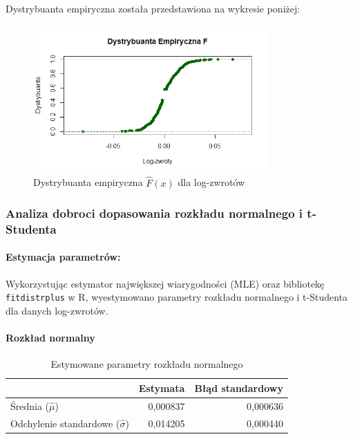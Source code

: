 \documentclass[a4paper,11pt]{article}
\begin{document}
Dystrybuanta empiryczna została przedstawiona na wykresie poniżej:

\begin{figure}[H]
    \centering
    \includegraphics[width=0.8\textwidth]{./Wojtek/dystrybuanta-empiryczna.png}
    \caption{Dystrybuanta empiryczna $\hat{F}(x)$ dla log-zwrotów}
    \label{fig:dystrybuanta_empiryczna}
\end{figure}

\subsubsection{Analiza dobroci dopasowania rozkładu normalnego i t-Studenta}

\paragraph{Estymacja parametrów:}

Wykorzystując estymator największej wiarygodności (MLE) oraz bibliotekę \texttt{fitdistrplus} w R, wyestymowano parametry rozkładu normalnego i t-Studenta dla danych log-zwrotów.

\paragraph{Rozkład normalny}

\begin{table}[H]
    \centering
    \begin{tabular}{|l|r|r|}
        \hline
        & \textbf{Estymata} & \textbf{Błąd standardowy} \\
        \hline
        Średnia ($\hat{\mu}$) & 0,000837 & 0,000636 \\
        Odchylenie standardowe ($\hat{\sigma}$) & 0,014205 & 0,000440 \\
        \hline
    \end{tabular}
    \caption{Estymowane parametry rozkładu normalnego}
    \label{tab:fit_norm}
\end{table}
\end{document}
